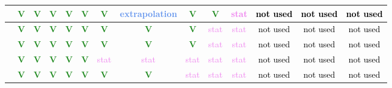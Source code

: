 \begin{frame}
{\begin{tabular}{|c||*{13}{c|}}
\hline
[283-344] & \textcolor{ForestGreen}{\textbf{V}} & \textcolor{ForestGreen}{\textbf{V}} & \textcolor{ForestGreen}{\textbf{V}} & \textcolor{ForestGreen}{\textbf{V}} & \textcolor{ForestGreen}{\textbf{V}} & \textcolor{ForestGreen}{\textbf{V}} & \textcolor{CornflowerBlue}{extrapolation} & \textcolor{ForestGreen}{\textbf{V}} & \textcolor{ForestGreen}{\textbf{V}} & \textcolor{violet}{stat} & \textcolor{black}{not used} & \textcolor{black}{not used} & \textcolor{black}{not used} \\
\hline
[344-443] & \textcolor{ForestGreen}{\textbf{V}} & \textcolor{ForestGreen}{\textbf{V}} & \textcolor{ForestGreen}{\textbf{V}} & \textcolor{ForestGreen}{\textbf{V}} & \textcolor{ForestGreen}{\textbf{V}} & \textcolor{ForestGreen}{\textbf{V}} & \textcolor{ForestGreen}{\textbf{V}} & \textcolor{ForestGreen}{\textbf{V}} & \textcolor{violet}{stat} & \textcolor{violet}{stat} & \textcolor{black}{not used} & \textcolor{black}{not used} & \textcolor{black}{not used} \\
\hline
[443-577] & \textcolor{ForestGreen}{\textbf{V}} & \textcolor{ForestGreen}{\textbf{V}} & \textcolor{ForestGreen}{\textbf{V}} & \textcolor{ForestGreen}{\textbf{V}} & \textcolor{ForestGreen}{\textbf{V}} & \textcolor{ForestGreen}{\textbf{V}} & \textcolor{ForestGreen}{\textbf{V}} & \textcolor{ForestGreen}{\textbf{V}} & \textcolor{violet}{stat} & \textcolor{violet}{stat} & \textcolor{black}{not used} & \textcolor{black}{not used} & \textcolor{black}{not used} \\
\hline
[577-606] & \textcolor{ForestGreen}{\textbf{V}} & \textcolor{ForestGreen}{\textbf{V}} & \textcolor{ForestGreen}{\textbf{V}} & \textcolor{ForestGreen}{\textbf{V}} & \textcolor{ForestGreen}{\textbf{V}} & \textcolor{violet}{stat} & \textcolor{violet}{stat} & \textcolor{violet}{stat} & \textcolor{violet}{stat} & \textcolor{violet}{stat} & \textcolor{black}{not used} & \textcolor{black}{not used} & \textcolor{black}{not used} \\
\hline
[606-1500] & \textcolor{ForestGreen}{\textbf{V}} & \textcolor{ForestGreen}{\textbf{V}} & \textcolor{ForestGreen}{\textbf{V}} & \textcolor{ForestGreen}{\textbf{V}} & \textcolor{ForestGreen}{\textbf{V}} & \textcolor{ForestGreen}{\textbf{V}} & \textcolor{ForestGreen}{\textbf{V}} & \textcolor{violet}{stat} & \textcolor{violet}{stat} & \textcolor{violet}{stat} & \textcolor{black}{not used} & \textcolor{black}{not used} & \textcolor{black}{not used} \\
\hline
\end{tabular}
}
\vspace{0.5cm}


\end{frame}
